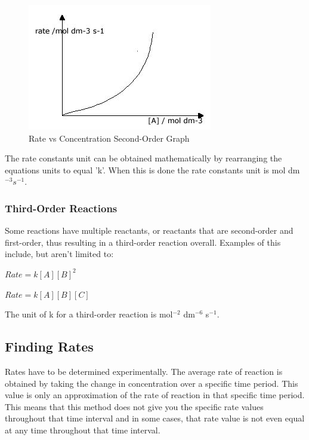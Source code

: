 \begin{figure}[H]
    \includegraphics[width=\textwidth]{./Planning/Images/SecondOrder.jpg}
    \caption{ Rate vs Concentration Second-Order Graph} \label{fig:Second Order Graph}
\end{figure}

The rate constants unit can be obtained mathematically by rearranging the equations units to equal 'k'. When this is done the rate constants unit is mol dm$^{-3} s^{-1}$.

\subsubsection{Third-Order Reactions}

Some reactions have multiple reactants, or reactants that are second-order and first-order, thus resulting in a third-order reaction overall. Examples of this include, but aren't limited to:

$Rate = k [A] [B]^2$ 

$Rate = k [A] [B] [C]$

The unit of k for a third-order reaction is mol$^{-2}$ dm$^{-6}$ s$^{-1}$.







	\subsection{Finding Rates}


Rates have to be determined experimentally. The average rate of reaction is obtained by taking the change in concentration over a specific time period. This value is only an approximation of the rate of reaction in that specific time period. This means that this method does not give you the specific rate values throughout that time interval and in some cases, that rate value is not even equal at any time throughout that time interval.

